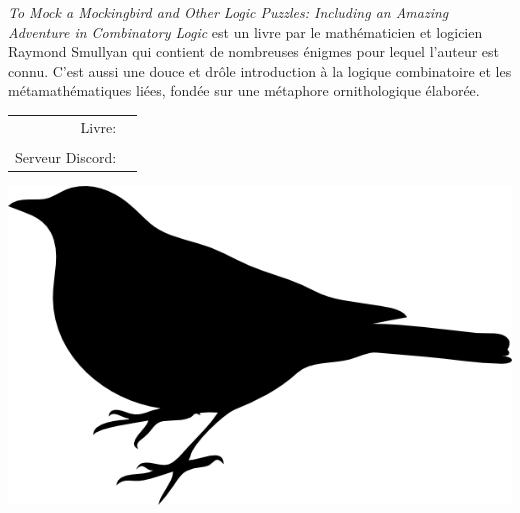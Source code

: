 \documentclass[letterpaper]{article}
\begin{document}


\emph{To Mock a Mockingbird and Other Logic Puzzles: Including an Amazing Adventure in Combinatory Logic} est un livre par le math\'ematicien et logicien Raymond Smullyan qui contient de nombreuses \'enigmes pour lequel l'auteur est connu. C'est aussi une douce et dr\^ole introduction \`a la logique combinatoire et les m\'etamath\'ematiques li\'ees, fond\'ee sur une m\'etaphore ornithologique \'elabor\'ee.

\vspace{0.75in}
\begin{tabular}{rl}
    \csctimefont Livre: &  \\
    & \\
    \csctimefont Serveur Discord: &
\end{tabular}

\vspace{0.5in}
\begin{center}
\includegraphics[scale = 0.75]{mockingbird_logo.png}
\end{center}

\vspace{-15pt}
\vspace{-15pt}
\centering {}
\end{document}
